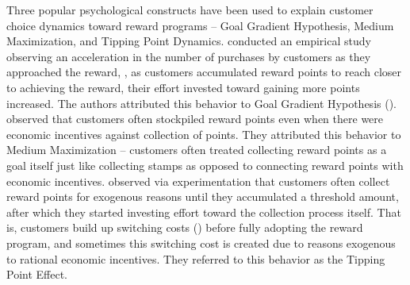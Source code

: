 Three popular psychological constructs have been used to explain customer choice dynamics toward reward programs -- Goal Gradient Hypothesis, Medium Maximization, and Tipping Point Dynamics.
\cite{kivetz2006goal} conducted an empirical study observing an acceleration in the number of purchases by customers as they approached the reward, \ie, as customers accumulated reward points to reach closer to achieving the reward, their effort invested toward gaining more points increased. 
The authors attributed this behavior to Goal Gradient Hypothesis (\cite{hull1932goal}).
\cite{stourm2015stockpiling, dreze2004using} observed that customers often stockpiled reward points even when there were economic incentives against collection of points. They attributed this behavior to Medium Maximization -- customers often treated collecting reward points as a goal itself just like collecting stamps as opposed to connecting reward points with economic incentives.
\cite{gao2014influence} observed via experimentation that customers often collect reward points for exogenous reasons until they accumulated a threshold amount, after which they started investing effort toward the collection process itself.
That is, customers build up switching costs (\cite{klemperer1995competition}) before fully adopting the reward program, and sometimes this switching cost is created due to reasons exogenous to rational economic incentives.
They referred to this behavior as the Tipping Point Effect.


